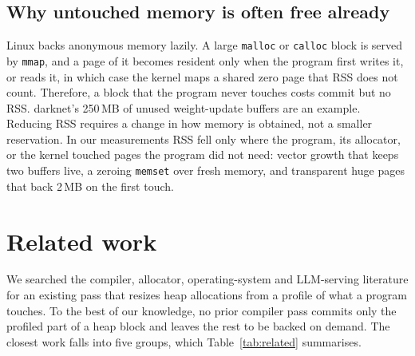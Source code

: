 \documentclass[11pt]{article}
\newcommand{\tabref}[1]{Table~\ref{#1}}
\begin{document}
\subsection{Why untouched memory is often free already}

Linux backs anonymous memory lazily. A large \texttt{malloc} or \texttt{calloc} block is served by \texttt{mmap},
and a page of it becomes resident only when the program first writes it, or reads it, in which case the kernel
maps a shared zero page that RSS does not count. Therefore, a block that the program never touches costs commit
but no RSS. darknet's 250\,MB of unused weight-update buffers are an example. Reducing RSS requires a change in
how memory is obtained, not a smaller reservation. In our measurements RSS fell only where the program, its
allocator, or the kernel touched pages the program did not need: vector growth that keeps two buffers live, a
zeroing \texttt{memset} over fresh memory, and transparent huge pages that back 2\,MB on the first touch.

\section{Related work}
\label{sec:related}

We searched the compiler, allocator, operating-system and LLM-serving literature for an existing pass that
resizes heap allocations from a profile of what a program touches. To the best of our knowledge, no prior
compiler pass commits only the profiled part of a heap block and leaves the rest to be backed on demand.
The closest work falls into five groups, which \tabref{tab:related} summarises.
\end{document}
